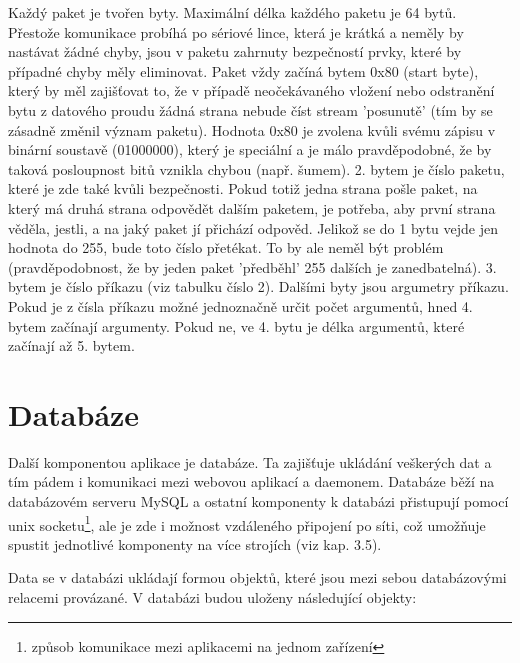 \documentclass[12pt, a4paper, oneside]{article}
\begin{document}
Každý paket je tvořen byty. Maximální délka každého paketu je 64 bytů.
Přestože komunikace probíhá po sériové lince, která je krátká a neměly by nastávat žádné chyby, jsou v paketu zahrnuty bezpečností prvky, které by případné chyby měly eliminovat.
Paket vždy začíná bytem 0x80 (start byte), který by měl zajišťovat to, že v případě neočekávaného vložení nebo odstranění bytu z datového proudu žádná strana nebude číst stream 'posunutě' (tím by se zásadně změnil význam paketu). Hodnota 0x80 je zvolena kvůli svému zápisu v binární soustavě (01000000), který je speciální a je málo pravděpodobné, že by taková posloupnost bitů vznikla chybou (např. šumem).
2. bytem je číslo paketu, které je zde také kvůli bezpečnosti. Pokud totiž jedna strana pošle paket, na který má druhá strana odpovědět dalším paketem, je potřeba, aby první strana věděla, jestli, a na jaký paket jí přichází odpověd. Jelikož se do 1 bytu vejde jen hodnota do 255, bude toto číslo přetékat. To by ale neměl být problém (pravděpodobnost, že by jeden paket 'předběhl' 255 dalších je zanedbatelná).
3. bytem je číslo příkazu (viz tabulku číslo 2).
Dalšími byty jsou argumetry příkazu. Pokud je z čísla příkazu možné jednoznačně určit počet argumentů, hned 4. bytem začínají argumenty. Pokud ne, ve 4. bytu je délka argumentů, které začínají až 5. bytem.

\section{Databáze}  %

Další komponentou aplikace je databáze. Ta zajišťuje ukládání veškerých dat a tím pádem i komunikaci mezi webovou aplikací a daemonem. Databáze běží na databázovém serveru MySQL a ostatní komponenty k databázi přistupují pomocí unix socketu\footnote{způsob komunikace mezi aplikacemi na jednom zařízení}, ale je zde i možnost vzdáleného připojení po síti, což umožňuje spustit jednotlivé komponenty na více strojích (viz kap. 3.5).

Data se v databázi ukládají formou objektů, které jsou mezi sebou databázovými relacemi provázané. V databázi budou uloženy následující objekty:
\end{document}
